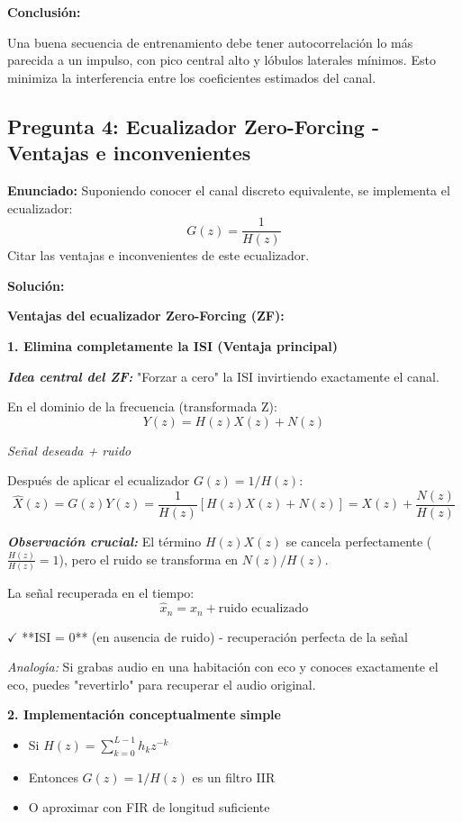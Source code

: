 \documentclass[11pt,a4paper]{article}
\begin{document}
\textbf{Conclusi\'on:}

Una buena secuencia de entrenamiento debe tener autocorrelaci\'on lo m\'as parecida a un impulso, con pico central alto y l\'obulos laterales m\'inimos. Esto minimiza la interferencia entre los coeficientes estimados del canal.



\subsection*{Pregunta 4: Ecualizador Zero-Forcing - Ventajas e inconvenientes}

\textbf{Enunciado:} Suponiendo conocer el canal discreto equivalente, se implementa el ecualizador:
\[
G(z) = \frac{1}{H(z)}
\]
Citar las ventajas e inconvenientes de este ecualizador.

\vspace{0.3cm}
\textbf{Soluci\'on:}

\textbf{Ventajas del ecualizador Zero-Forcing (ZF):}

\textbf{1. Elimina completamente la ISI (Ventaja principal)}

\textit{\textbf{Idea central del ZF:}} "Forzar a cero" la ISI invirtiendo exactamente el canal.

En el dominio de la frecuencia (transformada Z):
\[
Y(z) = H(z) X(z) + N(z)
\]

\textit{Se\~nal deseada + ruido}

Despu\'es de aplicar el ecualizador $G(z) = 1/H(z)$:
\[
\hat{X}(z) = G(z) Y(z) = \frac{1}{H(z)} [H(z) X(z) + N(z)] = X(z) + \frac{N(z)}{H(z)}
\]

\textit{\textbf{Observaci\'on crucial:}} El t\'ermino $H(z) X(z)$ se cancela perfectamente ($\frac{H(z)}{H(z)} = 1$), pero el ruido se transforma en $N(z)/H(z)$.

La se\~nal recuperada en el tiempo:
\[
\hat{x}_n = x_n + \text{ruido ecualizado}
\]

$\checkmark$ **ISI = 0** (en ausencia de ruido) - recuperaci\'on perfecta de la se\~nal

\textit{Analog\'{\i}a:} Si grabas audio en una habitaci\'on con eco y conoces exactamente el eco, puedes "revertirlo" para recuperar el audio original.

\textbf{2. Implementaci\'on conceptualmente simple}

\begin{itemize}
    \item Si $H(z) = \sum_{k=0}^{L-1} h_k z^{-k}$
    \item Entonces $G(z) = 1/H(z)$ es un filtro IIR
    \item O aproximar con FIR de longitud suficiente
\end{itemize}
\end{document}
